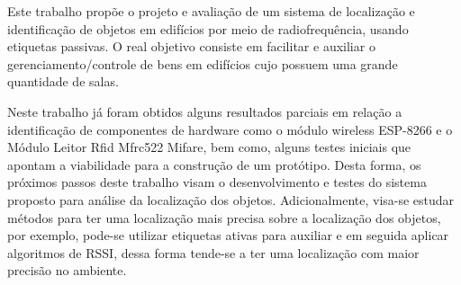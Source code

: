 
\label{chapter:consideracoes}

Este trabalho propõe o projeto e avaliação de um sistema de localização e identificação de objetos em edifícios por meio de
radiofrequência, usando etiquetas passivas. O real objetivo consiste em facilitar e auxiliar o gerenciamento/controle de
bens em edifícios cujo possuem uma grande quantidade de salas.

Neste trabalho já foram obtidos alguns resultados parciais em relação a identificação de componentes de hardware como o módulo wireless
ESP-8266 e o Módulo Leitor Rfid Mfrc522 Mifare, bem como, alguns testes iniciais que apontam a viabilidade para a construção de um
protótipo. Desta forma, os próximos passos deste trabalho visam o desenvolvimento e testes do sistema proposto para análise da
localização dos objetos. Adicionalmente, visa-se estudar métodos para ter uma localização mais precisa sobre a localização dos
objetos, por exemplo, pode-se utilizar etiquetas ativas para auxiliar e em seguida aplicar algoritmos de RSSI, dessa forma
tende-se a ter uma localização com maior precisão no ambiente.




